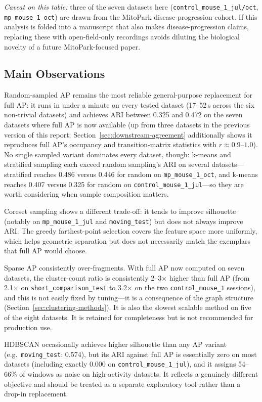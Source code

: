 \documentclass[11pt]{article}
\begin{document}
\textit{Caveat on this table:} three of the seven datasets here (\texttt{control\_mouse\_1\_jul/oct}, \texttt{mp\_mouse\_1\_oct}) are drawn from the MitoPark disease-progression cohort. If this analysis is folded into a manuscript that also makes disease-progression claims, replacing these with open-field-only recordings avoids diluting the biological novelty of a future MitoPark-focused paper.

\subsection{Main Observations}

Random-sampled AP remains the most reliable general-purpose replacement for full AP: it runs in under a minute on every tested dataset (17--52\,s across the six non-trivial datasets) and achieves ARI between 0.325 and 0.472 on the seven datasets where full AP is now available (up from three datasets in the previous version of this report; Section~\ref{sec:downstream-agreement} additionally shows it reproduces full AP's occupancy and transition-matrix statistics with $r \approx 0.9$--$1.0$). No single sampled variant dominates every dataset, though: k-means and stratified sampling each exceed random sampling's ARI on several datasets---stratified reaches 0.486 versus 0.446 for random on \texttt{mp\_mouse\_1\_oct}, and k-means reaches 0.407 versus 0.325 for random on \texttt{control\_mouse\_1\_jul}---so they are worth considering when sample composition matters.

Coreset sampling shows a different trade-off: it tends to improve silhouette (notably on \texttt{mp\_mouse\_1\_jul} and \texttt{moving\_test}) but does not always improve ARI. The greedy farthest-point selection covers the feature space more uniformly, which helps geometric separation but does not necessarily match the exemplars that full AP would choose.

Sparse AP consistently over-fragments. With full AP now computed on seven datasets, the cluster-count ratio is consistently 2--3$\times$ higher than full AP (from 2.1$\times$ on \texttt{short\_comparison\_test} to 3.2$\times$ on the two \texttt{control\_mouse\_1} sessions), and this is not easily fixed by tuning---it is a consequence of the graph structure (Section~\ref{sec:clustering-methods}). It is also the slowest scalable method on five of the eight datasets. It is retained for completeness but is not recommended for production use.

HDBSCAN occasionally achieves higher silhouette than any AP variant (e.g.\ \texttt{moving\_test}: 0.574), but its ARI against full AP is essentially zero on most datasets (including exactly 0.000 on \texttt{control\_mouse\_1\_jul}), and it assigns 54--66\% of windows as noise on high-activity datasets. It reflects a genuinely different objective and should be treated as a separate exploratory tool rather than a drop-in replacement.
\end{document}
